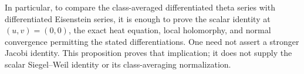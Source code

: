 In particular, to compare the class-averaged differentiated
theta series with differentiated Eisenstein series, it is
enough to prove the scalar identity at \((u,v)=(0,0)\),
the exact heat equation, local holomorphy, and normal
convergence permitting the stated differentiations.
One need not assert a stronger Jacobi identity.
This proposition proves that implication; it does not
supply the scalar Siegel--Weil identity or its
class-averaging normalization.
